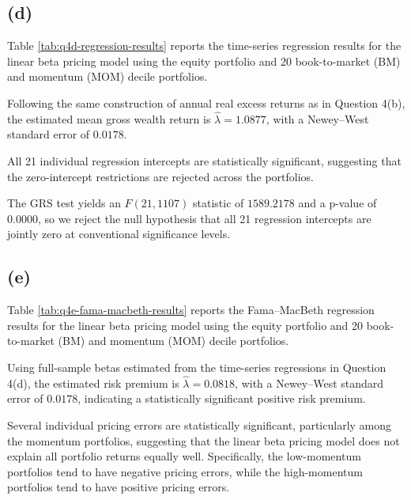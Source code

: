 \documentclass[11pt]{article}
\begin{document}
\FloatBarrier

\clearpage
\subsection*{(d)}
Table \ref{tab:q4d-regression-results} reports the time-series regression results for the linear beta pricing model using the equity portfolio and 20 book-to-market (BM) and momentum (MOM) decile portfolios.

Following the same construction of annual real excess returns as in Question 4(b), the estimated mean gross wealth return is \(\hat\lambda=1.0877\), with a Newey–West standard error of \(0.0178\).

All 21 individual regression intercepts are statistically significant, suggesting that the zero-intercept restrictions are rejected across the portfolios.

The GRS test yields an \(F(21,1107)\) statistic of \(1589.2178\) and a p-value of \(0.0000\), so we reject the null hypothesis that all 21 regression intercepts are jointly zero at conventional significance levels.


\FloatBarrier

\clearpage
\subsection*{(e)}
Table \ref{tab:q4e-fama-macbeth-results} reports the Fama–MacBeth regression results for the linear beta pricing model using the equity portfolio and 20 book-to-market (BM) and momentum (MOM) decile portfolios.

Using full-sample betas estimated from the time-series regressions in Question 4(d), the estimated risk premium is \(\hat\lambda=0.0818\), with a Newey–West standard error of \(0.0178\), indicating a statistically significant positive risk premium.

Several individual pricing errors are statistically significant, particularly among the momentum portfolios, suggesting that the linear beta pricing model does not explain all portfolio returns equally well. Specifically, the low-momentum portfolios tend to have negative pricing errors, while the high-momentum portfolios tend to have positive pricing errors.

\end{document}
